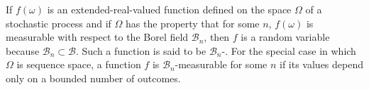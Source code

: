 If $f(\omega)$ is an extended-real-valued function defined on the space $\Omega$ of a stochastic process and if $\Omega$ has the property that for some $n$, $f(\omega)$ is measurable with respect to the Borel field $\mathcal{B}_n$, then $f$ is a random variable because $\mathcal{B}_n \subset \mathcal{B}$. Such a function is said to be $\mathcal{B}_n$-. For the special case in which $\Omega$ is sequence space, a function $f$ is $\mathcal{B}_n$-measurable for some $n$ if its values depend only on a bounded number of outcomes.
